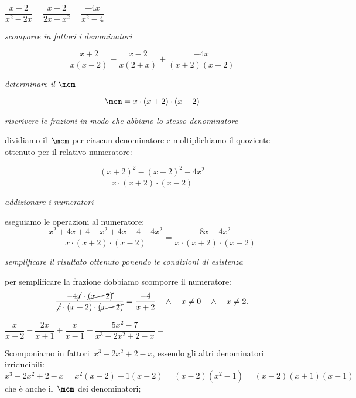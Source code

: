 \begin{exrig}
 \begin{esempio}
$\dfrac{x+2}{x^{2}-2x}-\dfrac{x-2}{2x+x^{2}}+\dfrac{-4x}{x^{2}-4}$
\begin{enumeratea}
 \item \emph{scomporre in fattori i denominatori}
 
  \[\frac{x+2}{x(x-2)}-\frac{x-2}{x(2+x)}+\frac{-4x}{(x+2)(x-2)}\]
  
 \item \emph{determinare il $\mcm$}
 
  \[\mcm = x\cdot (x+2) \cdot (x-2)\]
  

 \item \emph{riscrivere le frazioni in modo che abbiano lo stesso denominatore}
 
  dividiamo il~$\mcm$ per ciascun denominatore e moltiplichiamo il 
  quoziente ottenuto per il relativo numeratore:
  
    \[\frac{(x+2)^{2}-(x-2)^{2}-4x^{2}}{x\cdot(x+2)\cdot(x-2)}\]
    
 \item \emph{addizionare i numeratori} 
 
  eseguiamo le operazioni al numeratore:
    \begin{equation*}
     \frac{x^{2}+4x+4-x^{2}+4x-4-4x^{2}}{x\cdot(x+2)\cdot(x-2)}=
     \frac{8x-4x^{2}}{x\cdot(x+2)\cdot(x-2)}
     \end{equation*}
     
 \item \emph{semplificare il risultato ottenuto ponendo le condizioni di 
  esistenza}
 
  per semplificare la frazione dobbiamo scomporre il numeratore:
    \begin{equation*}
    \frac{-4\cancel{x}\cdot\cancel{(x-2)}}
         {\cancel{x}\cdot(x+2)\cdot\cancel{(x-2)}}=
    \frac{-4}{x+2} \quad \wedge \quad x \neq 0 \quad \wedge \quad x \neq 2.
    \end{equation*}
\end{enumeratea}
 \end{esempio}

 \begin{esempio}
$\dfrac{x}{x-2}-\dfrac{2x}{x+1}+
\dfrac{x}{x-1}-\dfrac{5x^{2}-7}{x^{3}-2x^{2}+2-x}=$
\begin{enumeratea}
 \item Scomponiamo in fattori~$x^{3}-2x^{2}+2-x$, 
  essendo gli altri denominatori irriducibili: 
  $x^{3}-2x^{2}+2-x=x^2(x-2)-1(x-2)=(x-2)\left(x^2-1\right)=
   (x-2)(x+1)(x-1)$ che è anche il~$\mcm$ dei denominatori;


\end{enumeratea}
\end{esempio}
\end{exrig}

